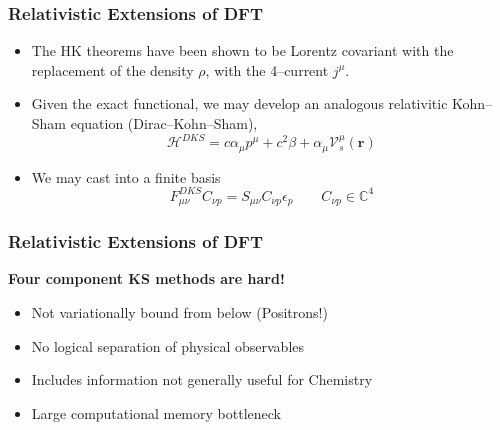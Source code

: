 \documentclass{beamer}
\begin{document}
\begin{frame}
\frametitle{Relativistic Extensions of DFT}

\begin{itemize}
  \item The HK theorems have been shown to be Lorentz covariant with the replacement
  of the density $\rho$, with the 4--current $j^\mu$.

  \item Given the exact functional, we may develop an analogous relativitic Kohn--Sham
  equation (Dirac--Kohn--Sham),
  \begin{equation*}
    \mathcal{H}^{DKS} = c\alpha_\mu p^\mu + c^2\beta + \alpha_\mu \mathcal{V}_s^\mu(\mathbf{r})
  \end{equation*}

  \item We may cast into a finite basis
  \begin{equation*}
    F_{\mu\nu}^{DKS} C_{\nu p} = S_{\mu\nu}C_{\nu p} \epsilon_p \qquad C_{\nu p} \in \mathbb{C}^4
  \end{equation*}
\end{itemize}
\end{frame}

\begin{frame}
\frametitle{Relativistic Extensions of DFT}

\begin{center} \bf \LARGE Four component KS methods are hard! \end{center}
\begin{itemize}
  \item Not variationally bound from below (Positrons!)
  \item No logical separation of physical observables
  \item Includes information not generally useful for Chemistry
  \item Large computational memory bottleneck
\end{itemize}

\end{frame}
\end{document}
